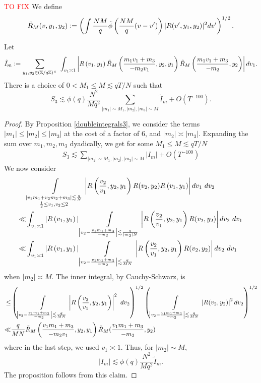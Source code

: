 \textcolor{red}{TO FIX}
We define \[
\tilde{R}_M(v,y_1,y_2) \mathrel{\mathop:}= \left( \int \frac{NM}{q}\tilde{\phi}\left(\frac{NM}{q}(v-v')\right)|R(v',y_1,y_2)|^2 dv'\right)^{1/2}.
\]
\begin{proposition} \label{dyadics_3}
    Let \[
    \tilde{I}_m\mathrel{\mathop:}= \sum_{y_1,y_2\in (\mathbb{Z}/q\mathbb{Z})^\times}\ \int_{v_1\asymp 1} 
         \left|R\left(v_1,y_1\right) \tilde{R}_M\left(\frac{m_1v_1+m_3}{-m_2v_1},y_2,y_1\right)
        \tilde{R}_M\left(\frac{m_1v_1+m_3}{-m_2},y_2\right)\right| dv_1.
    \]
    There is a choice of $0<M_1\leq M \lesssim qT/N$ such that \[
        S_3\lesssim \phi(q)\frac{N^2}{Mq^2}\sum_{|m_1|\sim M_1,|m_2|,|m_3|\sim M}\tilde{I}_m+O(T^{-100}).
    \]
\end{proposition}


\begin{proof}
By Proposition \ref{doubleintegrals3}, we consider the terms $|m_1|\leq |m_2|\leq|m_3|$ at the cost of a factor of $6$, and $|m_2|\asymp|m_3|$. Expanding the sum over $m_1,m_2,m_3$ dyadically, we get for some $M_1\leq M \lesssim qT/N $ \begin{align*}
    S_3\lesssim \sum_{|m_1|\sim M_1,|m_2|,|m_3|\sim M}|I_m| + O(T^{-100})
\end{align*}
We now consider
\begin{align*} 
   & \int\displaylimits_{\substack{
        |v_1m_1+v_2m_2+m_3|\lesssim \frac{q}{N}\\
        \frac{1}{2}\leq v_1,v_2\leq 2
    }} \left| R\left(\frac{v_2}{v_1},y_2,y_1\right)
    R(v_2,y_2)R\left(v_1,y_1\right)\right| dv_1 \ dv_2\\
     \ll& 
    \int_{v_1\asymp 1} |R\left(v_1,y_1\right)|
    \int\displaylimits_{\left|v_2 - \frac{v_1m_1+m_3}{-m_2}\right|\lesssim \frac{q}{|m_2|N}} \left| R\left(\frac{v_2}{v_1},y_2,y_1\right)
    R(v_2,y_2)\right|  dv_2 \ dv_1\\
    \ll& \int_{v_1\asymp 1} |R\left(v_1,y_1\right)|
    \int\displaylimits_{\left|v_2 - \frac{v_1m_1+m_3}{-m_2}\right|\lesssim \frac{q}{MN}} \left| R\left(\frac{v_2}{v_1},y_2,y_1\right)
    R(v_2,y_2)\right|  dv_2 \ dv_1\\
\end{align*}
when $|m_2|\asymp M$. The inner integral, by Cauchy-Schwarz,
is \begin{align*}
    \leq & \left(\int\displaylimits_{\left|v_2 - \frac{v_1m_1+m_3}{-m_2}\right|\lesssim \frac{q}{MN}} \left| R\left(\frac{v_2}{v_1},y_2,y_1\right)\right|^2 \ dv_2 \right)^{1/2}
    \left(
    \int\displaylimits_{\left|v_2 - \frac{v_1m_1+m_3}{-m_2}\right|\lesssim \frac{q}{MN}} \left|
    R(v_2,y_2)\right|^2  dv_2\right)^{1/2}\\
    \ll& \frac{q}{MN} \tilde{R}_M\left(\frac{v_1m_1+m_3}{-m_2v_1},y_2,y_1\right)  \tilde{R}_M(\frac{v_1m_1+m_3}{-m_2},y_2)
\end{align*}
where in the last step, we used $v_1\asymp 1$.
Thus, for $|m_2|\sim M$,
\[
|I_m|\lesssim \phi(q)\frac{N^2}{Mq^2}\tilde{I}_m.
\]
The proposition follows from this claim.
\end{proof}


